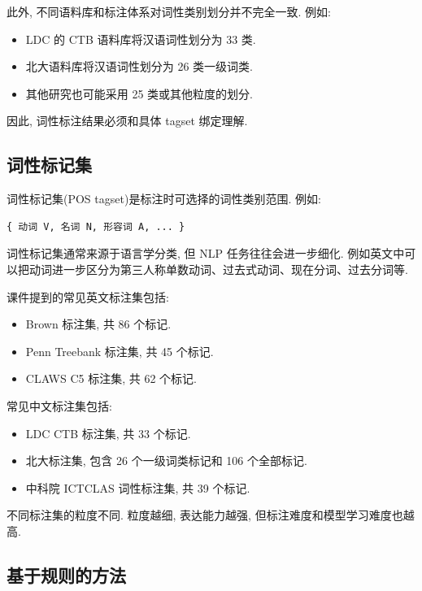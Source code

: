 此外, 不同语料库和标注体系对词性类别划分并不完全一致.
例如:

\begin{itemize}
\item LDC 的 CTB 语料库将汉语词性划分为 33 类.
\item 北大语料库将汉语词性划分为 26 类一级词类.
\item 其他研究也可能采用 25 类或其他粒度的划分.
\end{itemize}

因此, 词性标注结果必须和具体 tagset 绑定理解.

\subsection{词性标记集}


词性标记集(POS tagset)是标注时可选择的词性类别范围.
例如:

\begin{Verbatim}[breaklines=true,breakanywhere=true,fontsize=\small]
{ 动词 V, 名词 N, 形容词 A, ... }
\end{Verbatim}

词性标记集通常来源于语言学分类, 但 NLP 任务往往会进一步细化.
例如英文中可以把动词进一步区分为第三人称单数动词、过去式动词、现在分词、过去分词等.

课件提到的常见英文标注集包括:

\begin{itemize}
\item Brown 标注集, 共 86 个标记.
\item Penn Treebank 标注集, 共 45 个标记.
\item CLAWS C5 标注集, 共 62 个标记.
\end{itemize}

常见中文标注集包括:

\begin{itemize}
\item LDC CTB 标注集, 共 33 个标记.
\item 北大标注集, 包含 26 个一级词类标记和 106 个全部标记.
\item 中科院 ICTCLAS 词性标注集, 共 39 个标记.
\end{itemize}

不同标注集的粒度不同.
粒度越细, 表达能力越强, 但标注难度和模型学习难度也越高.

\subsection{基于规则的方法}


